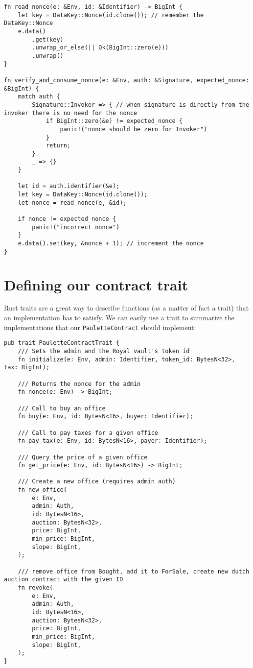 \documentclass[10pt]{article}
\begin{document}
\begin{verbatim}
fn read_nonce(e: &Env, id: &Identifier) -> BigInt {
    let key = DataKey::Nonce(id.clone()); // remember the DataKey::Nonce
    e.data()
        .get(key)
        .unwrap_or_else(|| Ok(BigInt::zero(e)))
        .unwrap()
}

fn verify_and_consume_nonce(e: &Env, auth: &Signature, expected_nonce: &BigInt) {
    match auth {
        Signature::Invoker => { // when signature is directly from the invoker there is no need for the nonce 
            if BigInt::zero(&e) != expected_nonce {
                panic!("nonce should be zero for Invoker")
            }
            return;
        }
        _ => {}
    }

    let id = auth.identifier(&e);
    let key = DataKey::Nonce(id.clone());
    let nonce = read_nonce(e, &id);

    if nonce != expected_nonce {
        panic!("incorrect nonce")
    }
    e.data().set(key, &nonce + 1); // increment the nonce
}

\end{verbatim}

\section*{Defining our contract trait}
Rust traits are a great way to describe functions (as a matter of fact a trait) that an implementation has to satisfy. We can easily use a trait to summarize the implementations that our \texttt{PauletteContract} should implement:

\begin{verbatim}
pub trait PauletteContractTrait {
    /// Sets the admin and the Royal vault's token id
    fn initialize(e: Env, admin: Identifier, token_id: BytesN<32>, tax: BigInt);

    /// Returns the nonce for the admin
    fn nonce(e: Env) -> BigInt;

    /// Call to buy an office
    fn buy(e: Env, id: BytesN<16>, buyer: Identifier);

    /// Call to pay taxes for a given office
    fn pay_tax(e: Env, id: BytesN<16>, payer: Identifier);

    /// Query the price of a given office
    fn get_price(e: Env, id: BytesN<16>) -> BigInt;

    /// Create a new office (requires admin auth)
    fn new_office(
        e: Env,
        admin: Auth,
        id: BytesN<16>,
        auction: BytesN<32>,
        price: BigInt,
        min_price: BigInt,
        slope: BigInt,
    );

    /// remove office from Bought, add it to ForSale, create new dutch auction contract with the given ID
    fn revoke(
        e: Env,
        admin: Auth,
        id: BytesN<16>,
        auction: BytesN<32>,
        price: BigInt,
        min_price: BigInt,
        slope: BigInt,
    );
}

\end{verbatim}
\end{document}
